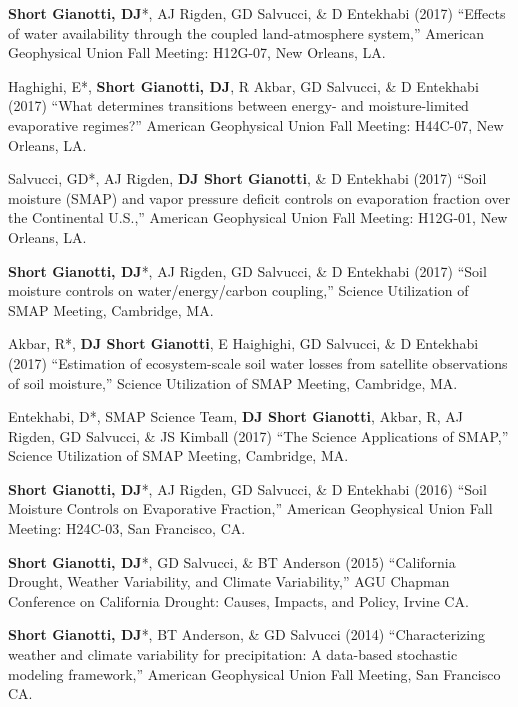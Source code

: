 \documentclass[10pt, a4paper]{article}
\newcommand{\lbr}{\vspace*{12pt}}
\newcommand{\years}[1]{\mbox{}\marginnote{\scriptsize #1}} %
\begin{document}
\years{2017}\textbf{Short Gianotti, DJ}*, AJ Rigden, GD Salvucci, \& D Entekhabi (2017) ``Effects of water availability through the coupled land-atmosphere system,'' American Geophysical Union Fall Meeting: H12G-07, New Orleans, LA.\lbr

\years{2017}Haghighi, E*, \textbf{Short Gianotti, DJ}, R Akbar, GD Salvucci, \& D Entekhabi (2017) ``What determines transitions between energy- and moisture-limited evaporative regimes?'' American Geophysical Union Fall Meeting: H44C-07, New Orleans, LA.\lbr

\years{2017}Salvucci, GD*, AJ Rigden, \textbf{DJ Short Gianotti}, \& D Entekhabi (2017) ``Soil moisture (SMAP) and vapor pressure deficit controls on evaporation fraction over the Continental U.S.,'' American Geophysical Union Fall Meeting: H12G-01, New Orleans, LA.\lbr

\years{2017}\textbf{Short Gianotti, DJ}*, AJ Rigden, GD Salvucci, \& D Entekhabi (2017) ``Soil moisture controls on water/energy/carbon coupling,'' Science Utilization of SMAP Meeting, Cambridge, MA.\lbr

\years{2017}Akbar, R*, \textbf{DJ Short Gianotti}, E Haighighi, GD Salvucci, \& D Entekhabi (2017) ``Estimation of ecosystem-scale soil water losses from satellite observations of soil moisture,'' Science Utilization of SMAP Meeting, Cambridge, MA.\lbr %

\years{2017}Entekhabi, D*, SMAP Science Team, \textbf{DJ Short Gianotti}, Akbar, R, AJ Rigden, GD Salvucci, \& JS Kimball (2017) ``The Science Applications of SMAP,'' Science Utilization of SMAP Meeting, Cambridge, MA.\lbr %

\years{2016}\textbf{Short Gianotti, DJ}*, AJ Rigden, GD Salvucci, \& D Entekhabi (2016) ``Soil Moisture Controls on Evaporative Fraction,'' American Geophysical Union Fall Meeting: H24C-03, San Francisco, CA.\lbr

\years{2015}\textbf{Short Gianotti, DJ}*, GD Salvucci, \& BT Anderson (2015) ``California Drought, Weather Variability, and Climate Variability,'' AGU Chapman Conference on California Drought: Causes, Impacts, and Policy, Irvine CA.\lbr

\years{2014}\textbf{Short Gianotti, DJ}*, BT Anderson, \& GD Salvucci (2014) ``Characterizing weather and climate variability for precipitation: A data-based stochastic modeling framework,'' American Geophysical Union Fall Meeting, San Francisco CA.\lbr
\end{document}
